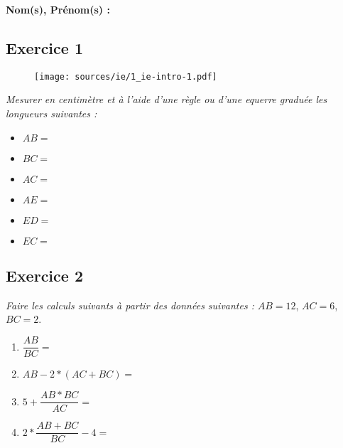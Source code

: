 \documentclass[13pt]{article}
\begin{document}

\setlength{\columnseprule}{1pt}

\textbf{Nom(s), Prénom(s) :}

\begin{multicols}{2}

  \subsection*{Exercice 1}

  \begin{figure}[H]
    \centering
    \texttt{[image: sources/ie/1\_ie-intro-1.pdf]}
  \end{figure}


  \textit{Mesurer en centimètre et à l'aide d'une règle ou d'une equerre graduée les longueurs suivantes :}\\

  \begin{itemize}
  \item $AB = $\\
  \item $BC = $\\
  \item $AC = $\\
  \item $AE = $\\
  \item $ED = $\\
  \item $EC = $\\
  \end{itemize}

\end{multicols}

\subsection*{Exercice 2}

\textit{Faire les calculs suivants à partir des données suivantes :}  $AB = 12$, $AC = 6$, $BC = 2$.

\begin{enumerate}
\item $\dfrac{AB}{BC} = $\\
\item $AB - 2*(AC + BC) = $\\
\item $5 + \dfrac{AB * BC}{AC} = $\\
\item $2 * \dfrac{AB + BC}{BC} - 4= $\\
\end{enumerate}
\end{document}
